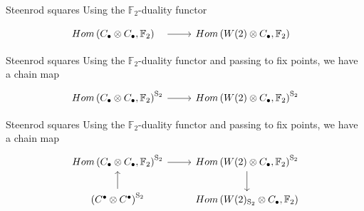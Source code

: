 \documentclass[10pt,t, handout]{beamer} %
\newcommand{\F}{\mathbb{F}}
\renewcommand{\S}{\mathrm{S}}
\begin{document}
\begin{frame}[fragile]{Steenrod squares}
	Using the $\F_2$-duality functor
	\begin{equation*}
	\begin{tikzcd}
	Hom\left(C_\bullet \otimes C_\bullet, \F_2 \right)^{\phantom{\S_2}} \arrow[r] &
	Hom\left(W(2) \otimes C_\bullet, \F_2 \right)^{\phantom{\S_2}}
	\end{tikzcd}
	\end{equation*}
\end{frame}
\begin{frame}[fragile]{Steenrod squares}
	Using the $\F_2$-duality functor and passing to fix points, we have a chain map 
	\begin{equation*}
	\begin{tikzcd}
	Hom\left(C_\bullet \otimes C_\bullet, \F_2 \right)^{\S_2} \arrow[r] &
	Hom\left(W(2) \otimes C_\bullet, \F_2 \right)^{\S_2}
	\end{tikzcd}
	\end{equation*}
	\addtocounter{framenumber}{-1}
\end{frame}
\begin{frame}[fragile]{Steenrod squares}
	Using the $\F_2$-duality functor and passing to fix points, we have a chain map 
	\begin{equation*}
	\begin{tikzcd}
	Hom\left(C_\bullet \otimes C_\bullet, \F_2 \right)^{\S_2} \arrow[r] &
	Hom\left(W(2) \otimes C_\bullet, \F_2 \right)^{\S_2} \arrow[d] \\
	\left(C^\bullet \otimes C^\bullet\right)^{\S_2} \arrow[u] &
	Hom\left(W(2)_{\S_2} \otimes C_\bullet, \F_2 \right)
	\end{tikzcd}
	\end{equation*}
	\addtocounter{framenumber}{-1}
\end{frame}
\end{document}
